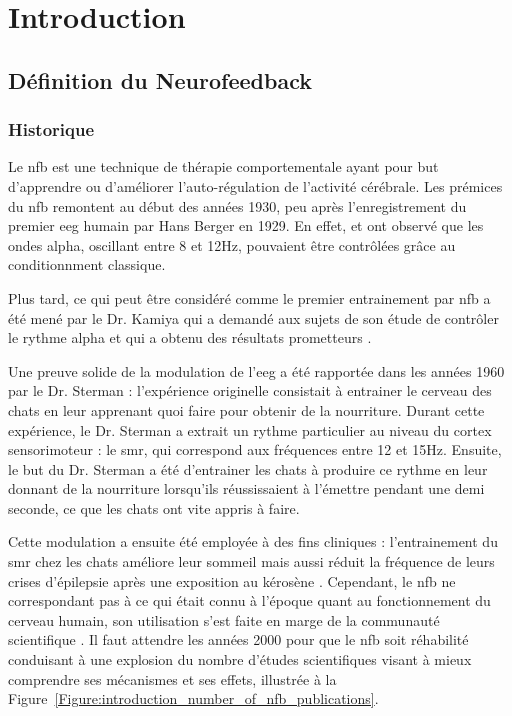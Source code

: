 \chapter{Introduction} \label{chapitre-1}

\section{Définition du Neurofeedback}

\subsection{Historique}

Le \gls{nfb} est une technique de thérapie comportementale ayant pour but d'apprendre ou d'améliorer l'auto-régulation de l'activité cérébrale.
Les prémices du \gls{nfb} remontent au début des années 1930, peu après l'enregistrement du premier \gls{eeg} humain par Hans Berger en 1929.
En effet, \citet{Durup1935} et \citet{Loomis1936} ont observé que les ondes alpha, oscillant entre 8 et 12Hz, pouvaient être contrôlées grâce au 
conditionnment classique. 

Plus tard, ce qui peut être considéré comme le premier entrainement par \gls{nfb} a été mené par le Dr. Kamiya qui a demandé aux sujets de son étude 
de contrôler le rythme alpha et qui a obtenu des résultats prometteurs \citep{Kamiya1969}. 

Une preuve solide de la modulation de l'\gls{eeg} a été rapportée dans les années 1960 par le Dr. Sterman : l'expérience 
originelle consistait à entrainer le cerveau des chats en leur apprenant quoi faire pour obtenir de 
la nourriture. Durant cette expérience, le Dr. Sterman a extrait un rythme particulier au niveau du cortex sensorimoteur : le \gls{smr}, qui correspond 
aux fréquences entre 12 et 15Hz. Ensuite, le but du Dr. Sterman a été d'entrainer les chats à produire ce rythme en leur donnant de la nourriture 
lorsqu'ils réussissaient à l'émettre pendant une demi seconde, ce que les chats ont vite appris à faire. 

Cette modulation a ensuite été employée à des fins cliniques : l'entrainement du \gls{smr} chez les chats améliore leur sommeil \citep{Sterman1970} mais aussi
réduit la fréquence de leurs crises d'épilepsie après une exposition au kérosène \citep{Sterman1974}. Cependant, le \gls{nfb} ne correspondant pas à ce qui 
était connu à l'époque quant au fonctionnement du cerveau humain, son utilisation s'est faite en marge de la communauté scientifique \citep{Masterpasqua2003}. 
Il faut attendre les années 2000 pour que le \gls{nfb} soit réhabilité conduisant à une explosion du nombre d'études scientifiques visant à mieux comprendre 
ses mécanismes et ses effets, illustrée à la Figure~\ref{Figure:introduction_number_of_nfb_publications}. 


